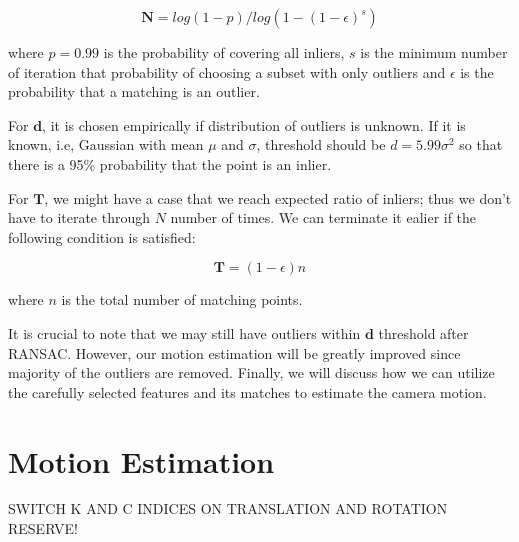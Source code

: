 \documentclass[a4paper]{report}
\numberwithin{figure}{section}
\begin{document}
\begin{equation}
  \mathbf{N} = log(1-p)/log(1-(1-\epsilon)^s)
\end{equation}

where $p=0.99$ is the probability of covering all inliers, $s$ is the 
minimum number of iteration that 
probability of choosing a subset with only outliers 
and $\epsilon$ is the probability that a matching is an outlier.

For $\mathbf{d}$, it is chosen empirically if distribution of outliers is unknown. If 
it is known, i.e, Gaussian with mean $\mu$ and $\sigma$, threshold should 
be $d=5.99\sigma^2$ so that there is a 95\% probability that the point is an inlier.

For $\mathbf{T}$, we might have a case that we reach expected ratio of inliers; thus 
we don't have to iterate through $N$ number of times. We can terminate it 
ealier if the following condition is satisfied:

\begin{equation}
  \mathbf{T} = (1-\epsilon)n
\end{equation}

where $n$ is the total number of matching points.

It is crucial 
to note that we may still have outliers within $\mathbf{d}$ threshold after 
RANSAC.
However, 
our motion estimation will be greatly improved since 
majority of the outliers are removed.
Finally, we will discuss how we can utilize the carefully selected features 
and its matches to estimate the camera motion.


\section{Motion Estimation} \label{sc_motion_estim}

SWITCH K AND C INDICES ON TRANSLATION AND ROTATION RESERVE!
\end{document}
